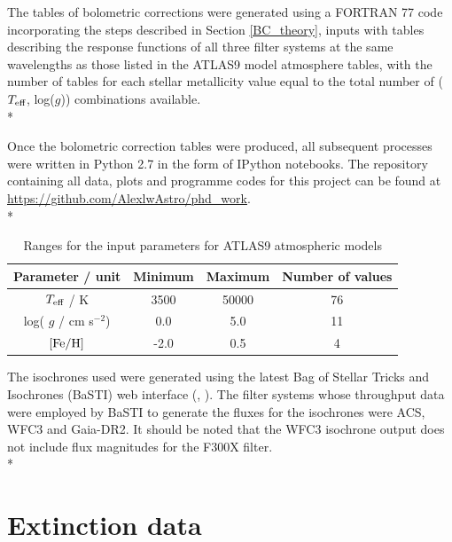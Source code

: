 \documentclass[12pt, a4paper]{report}
\begin{document}
The tables of bolometric corrections were generated using a FORTRAN 77 code incorporating the steps described in Section \ref{BC_theory}, inputs with tables describing the response functions of all three filter systems at the same wavelengths as those listed in the ATLAS9 model atmosphere tables, with the number of tables for each stellar metallicity value equal to the total number of ($T_{\textnormal{eff}}$, log($g$)) combinations available.\\*

Once the bolometric correction tables were produced, all subsequent processes were written in Python 2.7 in the form of IPython notebooks. The repository containing all data, plots and programme codes for this project can be found at \protect\url{https://github.com/AlexlwAstro/phd_work}.\\*


\begin{table}
\begin{center}
\begin{tabular}{cccc}
\hline
Parameter / unit & Minimum & Maximum & Number of values \\
\hline
$T_{\textnormal{eff}}$ / K & 3500 & 50000 & 76 \\
log( $g$ / cm s$^{-2}$) & 0.0 & 5.0 & 11 \\
$\textnormal{[Fe/H]}$ & -2.0 & 0.5 & 4 \\
\hline
\end{tabular}
\caption{Ranges for the input parameters for ATLAS9 atmospheric models}
\label{atlas9_input}
\end{center}
\end{table}


The isochrones used were generated using the latest Bag of Stellar Tricks and Isochrones (BaSTI) web interface (\cite{2004ApJ...612..168P}, \cite{2018ApJ...856..125H}). The filter systems whose throughput data were employed by BaSTI to generate the fluxes for the isochrones were ACS, WFC3 and Gaia-DR2. It should be noted that the WFC3 isochrone output does not include flux magnitudes for the F300X filter.\\*

\section{Extinction data}
\end{document}
